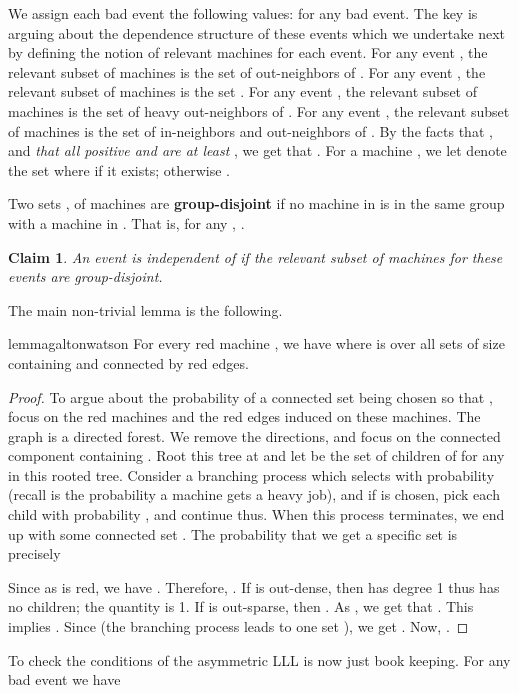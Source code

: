 \documentclass[11pt]{article}
\newenvironment{definition}{\begin{Definition}}{\end{Definition}}
\newtheorem{claim}{Claim}[section]
\newtheorem{definition}[lemma]{Definition}
\newtheorem{claim}[lemma]{Claim}
\begin{document}
We assign each bad event the following  values:  for any bad event. The key is arguing about the dependence structure of these events which we undertake next by defining the notion of relevant machines for each event.
For any event ,  the relevant subset of machines is the set  of out-neighbors of .  For any event ,  the relevant subset of machines is the set . For any event ,  the relevant subset of machines is the set  of heavy out-neighbors of .  For any event ,  the relevant subset of machines is the set  of in-neighbors and out-neighbors of . 
By the facts that  , and {\em that all positive  and  are at least} , we get that
. 
\def\group{{\tt group}}
For a machine , we let  denote the set  where  if it exists; otherwise . 
\begin{definition}
Two sets ,  of machines are {\bf group-disjoint} if no machine in  is in the same group with a machine in . That is, for any , .
\end{definition}

\begin{claim}
An event  is independent of  if the relevant subset of machines for these events are  group-disjoint.
\end{claim}

The main non-trivial lemma is the following.
\begin{restatable}{lemma}{galtonwatson}
\label{lem:galton-watson}
For every red machine , we have  where  is over all sets of size  containing  and connected by red edges.
\end{restatable}
\begin{proof} To argue about the probability of a connected set  being chosen so that ,  focus on the red machines  and the red edges induced on these machines.  The graph is a directed forest. We remove the directions, and focus on the connected component containing . Root this tree at  and let  be the set of children of  for any  in this rooted tree. Consider a branching process which selects  with probability  (recall  is the probability a machine  gets a heavy job), and if  is chosen, pick each child  with probability , and continue thus.
When this process terminates, we end up with some connected set . The probability that we get a specific set   is precisely 
\ifdefined\CR

\else

\fi
Since  as  is red, we have . Therefore, . If  is out-dense, then  has degree 1 thus has no children; the quantity is 1.
If  is out-sparse, then . As , we get that  . This implies .
Since  (the branching process leads to one set ), we get .
Now, 
.
\end{proof}
\noindent
To check the conditions of the asymmetric LLL is now just book keeping. 
For any bad event  we have 
\ifdefined\CR
\end{document}

